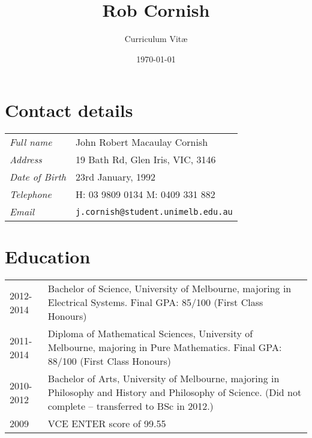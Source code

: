 \documentclass[12pt,a4paper]{article}
\title{\bfseries \huge Rob Cornish}
\author{Curriculum Vit\ae}
\date{\today}
\newenvironment{llist}
	{\renewcommand{\arraystretch}{1.5}\begin{tabular}{p{3cm} p{12cm}}}
	{\end{tabular}}
\begin{document}
\maketitle

\thispagestyle{empty}

\section*{Contact details}
\begin{llist}
	\textit{Full name} & John Robert Macaulay Cornish \\
	\textit{Address} & 19 Bath Rd, Glen Iris, VIC, 3146 \\
	\textit{Date of Birth} & 23rd January, 1992 \\
	\textit{Telephone} & H: 03 9809 0134 \newline M: 0409 331 882 \\
	\textit{Email} & \texttt{j.cornish@student.unimelb.edu.au}
\end{llist}

\section*{Education}
\begin{llist}
  2012-2014 & Bachelor of Science, University of Melbourne, majoring in
  Electrical Systems. Final GPA: 85/100 (First Class Honours) \\
  2011-2014 & Diploma of Mathematical Sciences, University of Melbourne,
  majoring in Pure Mathematics. Final GPA: 88/100 (First Class Honours) \\
  2010-2012 & Bachelor of Arts, University of Melbourne, majoring in Philosophy
  and History and Philosophy of Science. (Did not complete -- transferred to
  BSc in 2012.) \\
	2009 & VCE ENTER score of 99.55 \\
\end{llist}
\end{document}
